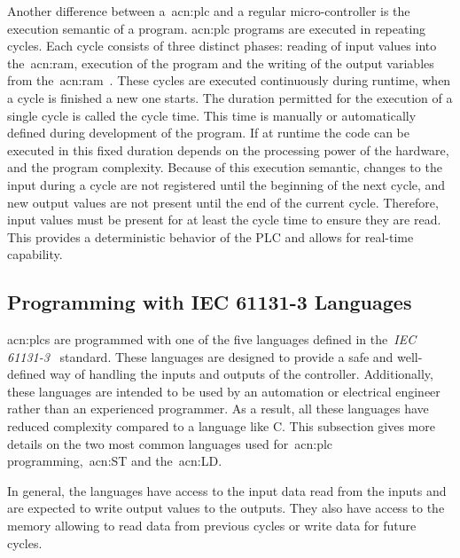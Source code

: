 Another difference between a~\acrshort{acn:plc} and a regular micro-controller is the execution semantic of a program.
\acrshort{acn:plc} programs are executed in repeating cycles.
Each cycle consists of three distinct phases: reading of input values into the~\acrshort{acn:ram}, execution of the program and the writing of the output variables from the~\acrshort{acn:ram}~\cite[p.~75]{BOLTON200653}.
These cycles are executed continuously during runtime, when a cycle is finished a new one starts.
The duration permitted for the execution of a single cycle is called the cycle time.
This time is manually or automatically defined  during development of the program.
If at runtime the code can be executed in this fixed duration depends on the processing power of the hardware, and the program complexity.
Because of this execution semantic, changes to the input during a cycle are not registered until the beginning of the next cycle, and new output values are not present until the end of the current cycle.
Therefore, input values must be present for at least the cycle time to ensure they are read.
This provides a deterministic behavior of the PLC and allows for real-time capability.

\subsection{Programming with IEC 61131-3 Languages}

\acrshort{acn:plc}s are programmed with one of the five languages defined in the~\textit{IEC 61131-3}~\cite{Plcopen:61131-3} standard.
These languages are designed to provide a safe and well-defined way of handling the inputs and outputs of the controller.
Additionally, these languages are intended to be used by an automation or electrical engineer rather than an experienced programmer.
As a result, all these languages have reduced complexity compared to a language like C.
This subsection gives more details on the two most common languages used for~\acrshort{acn:plc} programming,~\acrfull{acn:ST} and the~\acrfull{acn:LD}.

In general, the languages have access to the input data read from the inputs and are expected to write output values to the outputs.
They also have access to the memory allowing to read data from previous cycles or write data for future cycles.
\\

